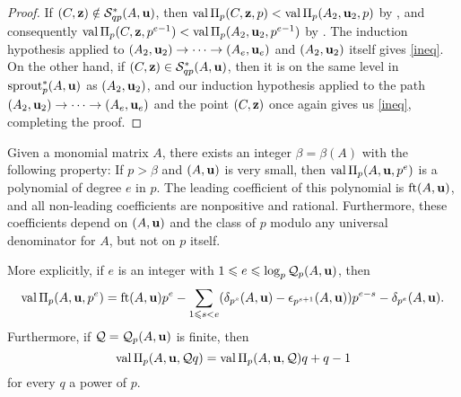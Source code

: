 \documentclass[11pt]{amsart}
\renewcommand{\S}{\mathcal{S}}
\begin{document}
\begin{proof}
   If $(C,\vv{z}) \notin \S^{\ast}_{qp}(A,\vv{u})$, then $\operatorname{val} \Pi_p(C,\mathbf{z}, p)< \operatorname{val} \Pi_p(A_2, \mathbf{u}_2, p)$ by , and consequently $\operatorname{val} \Pi_p(C, \mathbf{z},p^{e-1}) < \operatorname{val}\Pi_p(A_2,\mathbf{u}_2, p^{e-1})$ by .
   The induction hypothesis applied to $(A_2, \mathbf{u}_2) \to \cdots \to (A_e, \mathbf{u}_e)$ and $(A_2,\mathbf{u}_2)$ itself gives \eqref{ineq}.
   On the other hand, if $(C, \vv{z}) \in \S^{\ast}_{qp}(A,\vv{u})$, then it is on the same level in $\operatorname{sprout}_p^{\ast}(A,\mathbf{u})$ as $(A_2, \mathbf{u}_2)$, and  our induction hypothesis applied to the path $(A_2, \mathbf{u}_2) \to \cdots \to (A_e, \mathbf{u}_e)$ and the point $(C, \mathbf{z})$ once again gives us \eqref{ineq}, completing the proof.
\end{proof}

\begin{theorem}
   \label{main theorem wrt diagonal: T}
   Given a monomial matrix $A$, there exists an integer $\beta = \beta(A)$ with the following property\textup:
   If $p > \beta$ and $(A,\mathbf{u})$ is very small, then $\operatorname{val} \Pi_p(A,\mathbf{u},p^e)$ is a polynomial of degree $e$ in $p$.
   The leading coefficient of this polynomial is $\operatorname{ft}(A, \mathbf{u})$, and all non-leading coefficients are nonpositive and rational.
   Furthermore, these coefficients depend on $(A,\mathbf{u})$ and the class of $p$ modulo any universal denominator for $A$, but not on $p$ itself.

   More explicitly, if $e$ is an integer with $1 \leqslant e \leqslant \log_p \mathcal{Q}_p(A,\mathbf{u})$, then
   \[
      \operatorname{val} \Pi_p(A,\mathbf{u}, p^e) =  \operatorname{ft}(A, \mathbf{u})  p^e - \sum_{1 \leqslant s < e} ( \delta_{p^s}(A,\mathbf{u}) - \epsilon_{p^{s+1}}(A,\mathbf{u}))  p^{e-s} - \delta_{p^e}(A,\mathbf{u}).
   \]
   Furthermore, if $\mathcal{Q} = \mathcal{Q}_p(A,\mathbf{u})$ is finite, then
   \[
      \operatorname{val} \Pi_p(A,\mathbf{u}, \mathcal{Q} q) = \operatorname{val} \Pi_p(A,\mathbf{u}, \mathcal{Q})  q + q-1
   \]
   for every $q$ a power of $p$.
\end{theorem}
\end{document}
